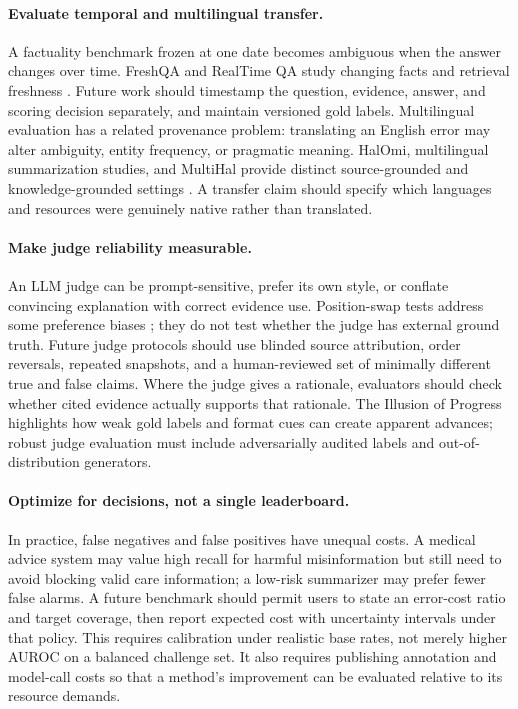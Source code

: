 \documentclass[11pt]{article}
\begin{document}
\paragraph{Evaluate temporal and multilingual transfer.} A factuality benchmark frozen at one date becomes ambiguous when the answer changes over time. FreshQA and RealTime QA study changing facts and retrieval freshness \citep{I011,I021}. Future work should timestamp the question, evidence, answer, and scoring decision separately, and maintain versioned gold labels. Multilingual evaluation has a related provenance problem: translating an English error may alter ambiguity, entity frequency, or pragmatic meaning. HalOmi, multilingual summarization studies, and MultiHal provide distinct source-grounded and knowledge-grounded settings \citep{I111,I109,I117}. A transfer claim should specify which languages and resources were genuinely native rather than translated.

\paragraph{Make judge reliability measurable.} An LLM judge can be prompt-sensitive, prefer its own style, or conflate convincing explanation with correct evidence use. Position-swap tests address some preference biases \citep{I105}; they do not test whether the judge has external ground truth. Future judge protocols should use blinded source attribution, order reversals, repeated snapshots, and a human-reviewed set of minimally different true and false claims. Where the judge gives a rationale, evaluators should check whether cited evidence actually supports that rationale. The Illusion of Progress \citep{I107} highlights how weak gold labels and format cues can create apparent advances; robust judge evaluation must include adversarially audited labels and out-of-distribution generators.

\paragraph{Optimize for decisions, not a single leaderboard.} In practice, false negatives and false positives have unequal costs. A medical advice system may value high recall for harmful misinformation but still need to avoid blocking valid care information; a low-risk summarizer may prefer fewer false alarms. A future benchmark should permit users to state an error-cost ratio and target coverage, then report expected cost with uncertainty intervals under that policy. This requires calibration under realistic base rates, not merely higher AUROC on a balanced challenge set. It also requires publishing annotation and model-call costs so that a method's improvement can be evaluated relative to its resource demands.
\end{document}
